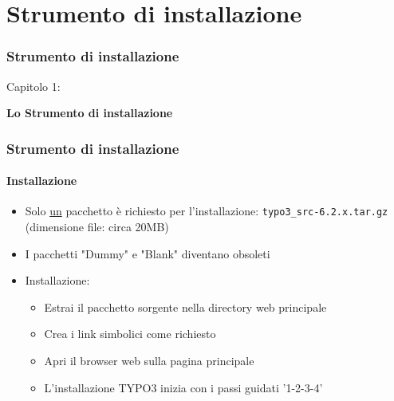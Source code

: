 %

\section{Strumento di installazione}
\begin{frame}[fragile]
	\frametitle{Strumento di installazione}

	\begin{center}\huge{Capitolo 1:}\end{center}
	\begin{center}\huge{\color{typo3darkgrey}\textbf{Lo Strumento di installazione}}\end{center}

\end{frame}


\begin{frame}[fragile]
	\frametitle{Strumento di installazione}
	\framesubtitle{Installazione}

	\begin{itemize}
		\item Solo \underline{un} pacchetto è richiesto per l'installazione:\newline
				\texttt{typo3\_src-6.2.x.tar.gz} (dimensione file: circa 20MB)
		\item I pacchetti "Dummy" e "Blank" diventano obsoleti
		\item Installazione:
			\begin{itemize}
				\item Estrai il pacchetto sorgente nella directory web principale
				\item Crea i link simbolici come richiesto
				\item Apri il browser web sulla pagina principale
				\item L'installazione TYPO3 inizia con i passi guidati '1-2-3-4'
			\end{itemize}

	\end{itemize}

\end{frame}


